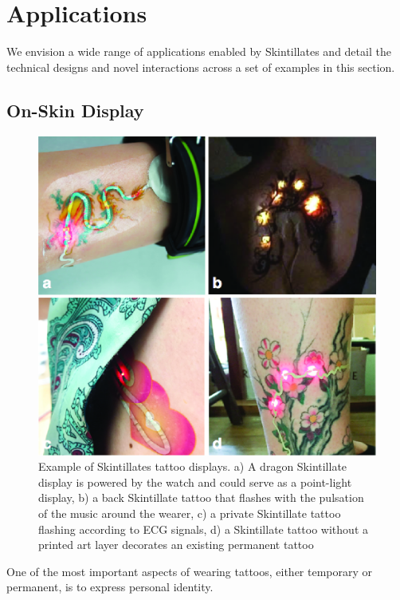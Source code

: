 \documentclass{sigchi}
\begin{document}
\section{Applications}
We envision a wide range of applications enabled by Skintillates and detail the technical designs and novel interactions across a set of examples in this section.
\subsection{On-Skin Display}
\begin{figure}[!b]
\centering
\includegraphics[width=1\columnwidth]{figures/Figure6}
\caption{Example of Skintillates tattoo displays. a) A dragon Skintillate display is powered by the watch and could serve as a point-light display, b) a back Skintillate tattoo that flashes with the pulsation of the music around the wearer, c) a private Skintillate tattoo flashing according to ECG signals, d) a Skintillate tattoo without a printed art layer decorates an existing permanent tattoo}
\vspace{-8pt}
\label{fig:displays}
\end{figure}
One of the most important aspects of wearing tattoos, either temporary or permanent, is to express personal identity. 
\end{document}
